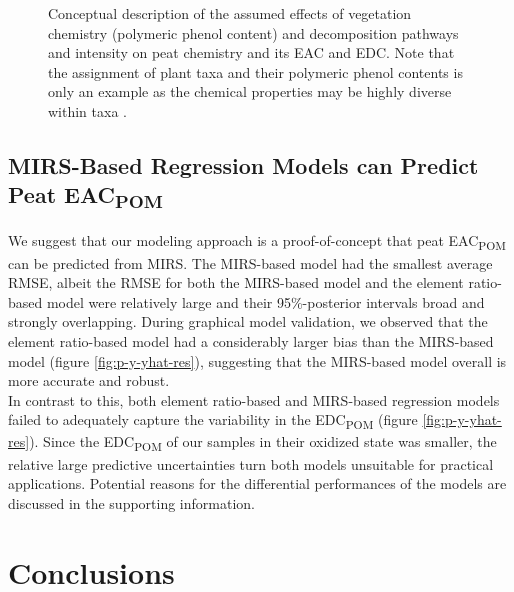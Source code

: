 \documentclass[alpha-refs]{wiley-article-rmd}
\begin{document}
\begin{refsection}
\begin{figure}[H]
{}

\caption{Conceptual description of the assumed effects of vegetation chemistry (polymeric phenol content) and decomposition pathways and intensity on peat chemistry and its EAC and EDC. Note that the assignment of plant taxa and their polymeric phenol contents is only an example as the chemical properties may be highly diverse within taxa \autocite{Bengtsson.2018}.}\label{fig:conceptual1}
\end{figure}

\hypertarget{mirs-based-regression-models-can-predict-peat-eac}{%
\subsection{\texorpdfstring{MIRS-Based Regression Models can Predict Peat EAC\textsubscript{POM}}{MIRS-Based Regression Models can Predict Peat EAC}}\label{mirs-based-regression-models-can-predict-peat-eac}}

We suggest that our modeling approach is a proof-of-concept that peat EAC\textsubscript{POM} can be predicted from MIRS. The MIRS-based model had the smallest average RMSE, albeit the RMSE for both the MIRS-based model and the element ratio-based model were relatively large and their 95\%-posterior intervals broad and strongly overlapping. During graphical model validation, we observed that the element ratio-based model had a considerably larger bias than the MIRS-based model (figure \ref{fig:p-y-yhat-res}), suggesting that the MIRS-based model overall is more accurate and robust.\\
In contrast to this, both element ratio-based and MIRS-based regression models failed to adequately capture the variability in the EDC\textsubscript{POM} (figure \ref{fig:p-y-yhat-res}). Since the EDC\textsubscript{POM} of our samples in their oxidized state was smaller, the relative large predictive uncertainties turn both models unsuitable for practical applications.
Potential reasons for the differential performances of the models are discussed in the supporting information.

\hypertarget{conclusions}{%
\section{Conclusions}\label{conclusions}}


\end{refsection}
\end{document}
